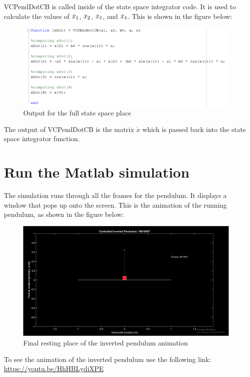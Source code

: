 \documentclass[11pt]{report}
\begin{document}
VCPendDotCB is called inside of the state space integrator code. It is used to calculate the values of $\dot{x}\textsubscript{1}$, $\dot{x}\textsubscript{2}$, $\dot{x}\textsubscript{3}$, and $\dot{x}\textsubscript{4}$. This is shown in the figure below:

\begin{figure}[H]
\centerline{\includegraphics[width=12cm]{VCPEndDotCB.png}}
\caption{Output for the full state space place}
\label{fig}
\end{figure}

The output of VCPendDotCB is the matrix $\dot{x}$ which is passed back into the state space integrator function. 

\section{Run the Matlab simulation}

The simulation runs through all the frames for the pendulum. It displays a window that pops up onto the screen. This is the animation of the running pendulum, as shown in the figure below:

\begin{figure}[H]
\centerline{\includegraphics[width=12cm]{finalPendulumState.png}}
\caption{Final resting place of the inverted pendulum animation}
\label{fig}
\end{figure}

To see the animation of the inverted pendulum use the following link: \href{https://youtu.be/HhHBLydiXPE}{https://youtu.be/HhHBLydiXPE}\\
\end{document}

